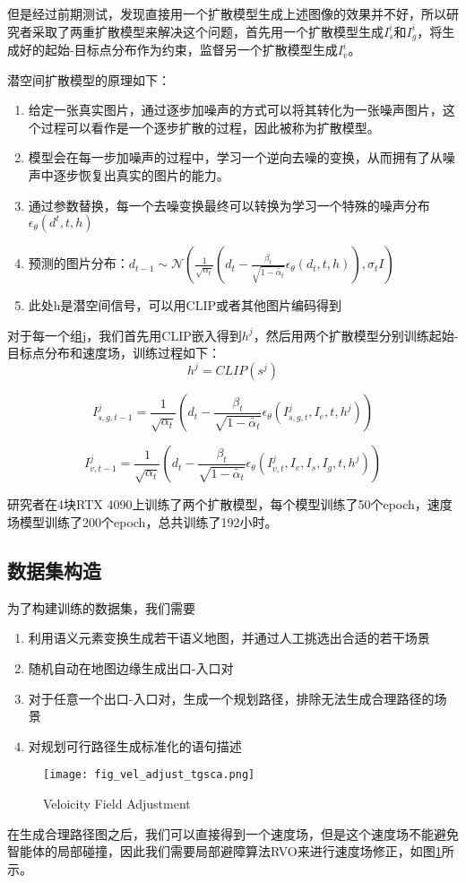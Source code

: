 但是经过前期测试，发现直接用一个扩散模型生成上述图像的效果并不好，所以研究者采取了两重扩散模型来解决这个问题，首先用一个扩散模型生成$I_s^i$和$I_g^i$，将生成好的起始-目标点分布作为约束，监督另一个扩散模型生成$I_v^i$。

潜空间扩散模型的原理如下：
\begin{enumerate}
    \item 给定一张真实图片，通过逐步加噪声的方式可以将其转化为一张噪声图片，这个过程可以看作是一个逐步扩散的过程，因此被称为扩散模型。
    \item 模型会在每一步加噪声的过程中，学习一个逆向去噪的变换，从而拥有了从噪声中逐步恢复出真实的图片的能力。
    \item 通过参数替换，每一个去噪变换最终可以转换为学习一个特殊的噪声分布$\epsilon_\theta(d^t,t,h)$
    \item 预测的图片分布：$d_{t-1}\sim \mathcal{N}(\frac{1}{\sqrt{\alpha_t}}(d_t-\frac{\beta_t}{\sqrt{1-\tilde{\alpha_t}}}\epsilon_\theta(d_t,t,h)), \sigma_t I)$
    \item 此处h是潜空间信号，可以用CLIP或者其他图片编码得到
\end{enumerate}

对于每一个组j，我们首先用CLIP嵌入得到$h^j$，然后用两个扩散模型分别训练起始-目标点分布和速度场，训练过程如下：
$$h^j=CLIP(s^j)$$

$$I^j_{s,g,t-1}= \frac{1}{\sqrt{\alpha_t}}(d_t-\frac{\beta_t}{\sqrt{1-\tilde{\alpha_t}}}\epsilon_\theta(I^j_{s,g,t},I_e,t,h^j))$$

$$I^j_{v,t-1}= \frac{1}{\sqrt{\alpha_t}}(d_t-\frac{\beta_t}{\sqrt{1-\tilde{\alpha_t}}}\epsilon_\theta(I^j_{v,t},I_e,I_s,I_g,t,h^j))$$

研究者在4块RTX 4090上训练了两个扩散模型，每个模型训练了50个epoch，速度场模型训练了200个epoch，总共训练了192小时。

\subsection{数据集构造}

为了构建训练的数据集，我们需要

\begin{enumerate}
    \item 利用语义元素变换生成若干语义地图，并通过人工挑选出合适的若干场景
    \item 随机自动在地图边缘生成出口-入口对
    \item 对于任意一个出口-入口对，生成一个规划路径，排除无法生成合理路径的场景
    \item 对规划可行路径生成标准化的语句描述
\end{enumerate}


\begin{figure}[H]
    \texttt{[image: fig\_vel\_adjust\_tgsca.png]}
    \caption{Veloicity Field Adjustment}
    \label{fig:vel_adjust}
\end{figure}


在生成合理路径图之后，我们可以直接得到一个速度场，但是这个速度场不能避免智能体的局部碰撞，因此我们需要局部避障算法RVO\cite{vandenbergReciprocalVelocityObstacles2008}来进行速度场修正，如图\ref{fig:vel_adjust}所示。

